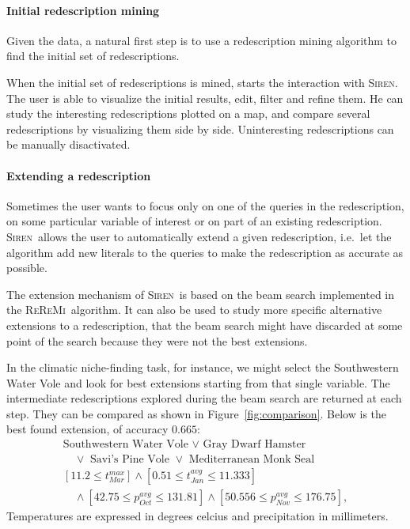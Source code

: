 \documentclass{sig-alternate}
\newcommand{\prg}[1]{\paragraph{#1}}
\newcommand{\Siren}{\textsc{Siren}}
\newcommand{\ReReMi}{\textsc{ReReMi}}
\begin{document}
\prg{Initial redescription mining}
Given the data, a natural first step is to use a redescription mining
algorithm to find the initial set of redescriptions. 

When the initial set of redescriptions is mined, starts the
interaction with \Siren.  The user is able to visualize the initial results,
edit, filter and refine them.  He can study the interesting
redescriptions plotted on a map, and compare several redescriptions by
visualizing them side by side. Uninteresting redescriptions can be
manually disactivated.
 
\prg{Extending a redescription} 
Sometimes the user wants to focus only on one of the queries in the
redescription, on some particular variable of interest or on part of
an existing redescription.  \Siren\ allows the user to automatically
extend a given redescription, i.e.\ let the algorithm add new literals
to the queries to make the redescription as accurate as possible.

The extension mechanism of \Siren\ is based on the beam search
implemented in the \ReReMi\ algorithm.  It can also be used to study
more specific alternative extensions to a redescription, that the beam
search might have discarded at some point of the search because they
were not the best extensions.

In the climatic niche-finding task, for instance, we might select the Southwestern Water Vole and look for best extensions starting from that single variable. The intermediate redescriptions
explored during the beam search are returned at each step. 
They can be compared as shown in Figure~\ref{fig:comparison}. Below is the best found extension, of accuracy $0.665$:
\begin{equation*}
\begin{array}{l}
\text{Southwestern Water Vole }\lor\text{ Gray Dwarf Hamster }\\[1mm]
\quad\lor\text{ Savi's Pine Vole }\lor\text{ Mediterranean Monk Seal}\\[3mm]
[11.2 \leq t_{Mar}^{max}] \land  [0.51 \leq t_{Jan}^{avg} \leq 11.333]\\[1mm]
\quad\land  [42.75 \leq p_{Oct}^{avg} \leq 131.81] \land [50.556 \leq p_{Nov}^{avg} \leq 176.75],
\end{array}
\end{equation*}
Temperatures are expressed in degrees celcius and precipitation in millimeters.

\end{document}

